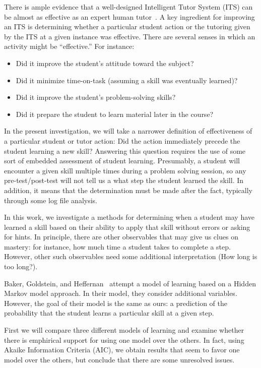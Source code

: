 \documentclass{acmlarge-edm}
\begin{document}
There is ample evidence that a well-designed Intelligent Tutor 
System (ITS) can be almost as effective as an expert human 
tutor~\cite{vanlehn_relative_2011}.  A key ingredient for improving an ITS is
determining whether a particular student action or the 
tutoring given by the ITS at a given instance was effective.
There are several senses in which an activity might be ``effective.''
For instance:  
%
\begin{itemize}
\item Did it improve the student's attitude toward
the subject?  
\item Did it minimize time-on-task (assuming 
a skill was eventually learned)?  
\item Did it improve the student's 
problem-solving skills?  
\item Did it prepare the student to learn
material later in the course?
\end{itemize}

In the present investigation, we will take a narrower definition
of effectiveness of a particular student or tutor action:  
Did the action immediately precede the
student learning a new skill?  Answering this question requires
the use of some sort of embedded assessment of student learning.
Presumably, a student will encounter a given skill multiple times
during a problem solving session, so any pre-test/post-test will
not tell us a what step the student learned the skill.
In addition, it means that the determination must be made
after the fact, typically through some log file analysis. 

In this work, we investigate a methods for determining
when a student may have learned a skill based on their
ability to apply that skill without errors or asking for hints.
In principle, there are other observables that may give us
clues on mastery:  for instance, how much time a student takes
to complete a step.  However, other such observables need
some additional interpretation (How long is too long?).

Baker, Goldstein, and Heffernan~\cite{baker_detecting_2010} attempt a model
of learning based on a Hidden Markov model approach.  In their
model, they consider additional variables.  However, the
goal of their model is the same as ours:  a prediction 
of the probability that the student learns a particular
skill at a given step.

First we will compare three different models of learning
and examine whether there is emphirical support for using
one model over the others.  In fact, using Akaike Information
Criteria (AIC), we obtain results that seem to favor one 
model over the others, but conclude that there are some
unresolved issues.
\end{document}
